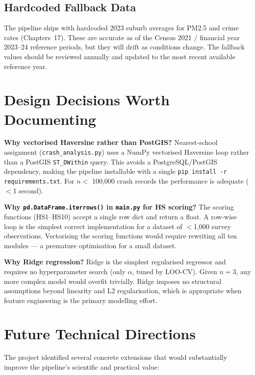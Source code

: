\documentclass[11pt,a4paper,openany]{book}
\begin{document}
\subsection{Hardcoded Fallback Data}

The pipeline ships with hardcoded 2023 suburb averages for PM2.5 and crime rates
(Chapters~17).  These are accurate as of the Census 2021 / financial year 2023--24
reference periods, but they will drift as conditions change.  The fallback values should
be reviewed annually and updated to the most recent available reference year.

\section{Design Decisions Worth Documenting}

\textbf{Why vectorised Haversine rather than PostGIS?}  Nearest-school assignment
(\texttt{crash\_analysis.py}) uses a NumPy vectorised Haversine loop rather than a
PostGIS \texttt{ST\_DWithin} query.  This avoids a PostgreSQL/PostGIS dependency,
making the pipeline installable with a single \texttt{pip install -r requirements.txt}.
For $n <$ 100,000 crash records the performance is adequate ($<$1 second).

\textbf{Why \texttt{pd.DataFrame.iterrows()} in \texttt{main.py} for HS scoring?}
The scoring functions (HS1--HS10) accept a single row dict and return a float.  A
row-wise loop is the simplest correct implementation for a dataset of $<$1,000 survey
observations.  Vectorising the scoring functions would require rewriting all ten modules
--- a premature optimisation for a small dataset.

\textbf{Why Ridge regression?}  Ridge is the simplest regularised regressor and requires
no hyperparameter search (only $\alpha$, tuned by LOO-CV).  Given $n = 3$, any more
complex model would overfit trivially.  Ridge imposes no structural assumptions beyond
linearity and L2 regularisation, which is appropriate when feature engineering is the
primary modelling effort.

\section{Future Technical Directions}

The project identified several concrete extensions that would substantially improve
the pipeline's scientific and practical value:
\end{document}
